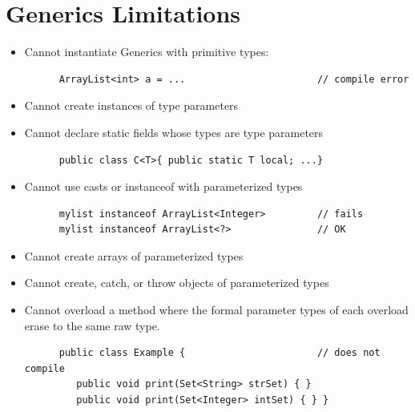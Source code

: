 \section{Generics Limitations}
\begin{itemize}
   \item Cannot instantiate Generics with primitive types:
   \begin{lstlisting}
      ArrayList<int> a = ...                       // compile error
   \end{lstlisting}
   \item Cannot create instances of type parameters
   \item Cannot declare static fields whose types are type parameters
   \begin{lstlisting}
      public class C<T>{ public static T local; ...}
   \end{lstlisting}
   \item Cannot use casts or instanceof with parameterized types
   \begin{lstlisting}
      mylist instanceof ArrayList<Integer>         // fails
      mylist instanceof ArrayList<?>               // OK
   \end{lstlisting}
   \item Cannot create arrays of parameterized types
   \item Cannot create, catch, or throw objects of parameterized types
   \item Cannot overload a method where the formal parameter types of each overload erase to the same raw type.
   \begin{lstlisting}
      public class Example {                       // does not compile
         public void print(Set<String> strSet) { }
         public void print(Set<Integer> intSet) { } }
   \end{lstlisting}
\end{itemize}


